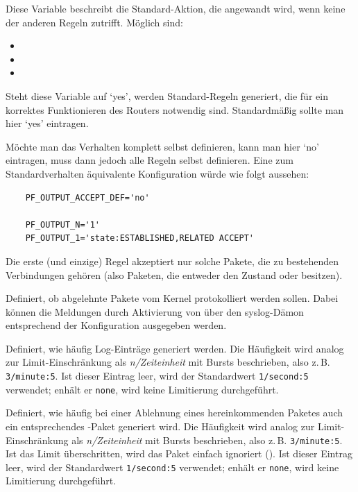 \begin{description}
Diese Variable beschreibt die Standard-Aktion, die angewandt wird,
wenn keine der anderen Regeln zutrifft. Möglich sind:

\begin{itemize}
\item {}
\item {}
\item {}
\end{itemize}

Steht diese Variable auf `yes', werden Standard-Regeln generiert, die
für ein korrektes Funktionieren des Routers notwendig
sind. Standardmäßig sollte man hier `yes' eintragen.

Möchte man das Verhalten komplett selbst definieren, kann man
hier `no' eintragen, muss dann jedoch alle Regeln selbst definieren.
Eine zum Standardverhalten äquivalente Konfiguration würde wie folgt
aussehen:

\begin{example}
{\footnotesize
\begin{verbatim}
    PF_OUTPUT_ACCEPT_DEF='no'

    PF_OUTPUT_N='1'
    PF_OUTPUT_1='state:ESTABLISHED,RELATED ACCEPT'
\end{verbatim}}
\end{example}

Die erste (und einzige) Regel akzeptiert nur solche Pakete, die zu bestehenden
Verbindungen gehören (also Paketen, die entweder den Zustand
 oder  besitzen).

Definiert, ob abgelehnte Pakete vom Kernel protokolliert werden sollen.
Dabei können die Meldungen durch Aktivierung von  über den
syslog-Dämon entsprechend der Konfiguration ausgegeben werden.

Definiert, wie häufig Log-Einträge generiert werden. Die Häufigkeit
wird analog zur Limit-Einschränkung als \emph{n/Zeiteinheit} mit Bursts
beschrieben, also z.\,B. \texttt{3/minute:5}. Ist dieser Eintrag leer, wird der
Standardwert \texttt{1/second:5} verwendet; enhält er \texttt{none}, wird keine
Limitierung durchgeführt.

Definiert, wie häufig bei einer Ablehnung eines hereinkommenden Paketes
auch ein entsprechendes -Paket generiert wird. Die Häufigkeit
wird analog zur Limit-Einschränkung als \emph{n/Zeiteinheit} mit Bursts
beschrieben, also z.\,B. \texttt{3/minute:5}. Ist das Limit überschritten, wird
das Paket einfach ignoriert (). Ist dieser Eintrag leer, wird
der Standardwert \texttt{1/second:5} verwendet; enhält er \texttt{none}, wird
keine Limitierung durchgeführt.


\end{description}
